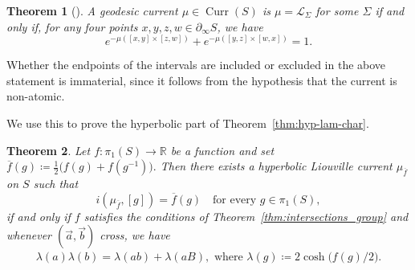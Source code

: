 \documentclass[11pt]{amsart}
\newcommand{\ora}[1]{\overrightarrow{#1}}
\numberwithin{equation}{section}
\numberwithin{figure}{section}
\newtheorem{theorem}{Theorem}[section]
\theoremstyle{definition}
\theoremstyle{plain}
\DeclareMathOperator{\Curr}{Curr}
\begin{document}
\begin{theorem}[{\cite[Theorem~13]{Bonahon88:GeodesicCurrent}}]   \label{thm:bonahonliouville}
   A geodesic current $\mu \in \Curr(S)$ is $\mu=\mathcal{L}_{\Sigma}$ for some $\Sigma$ if and only if, for any four points $x,y,z,w \in \partial_{\infty} S$, we have
   \[
      e^{-\mu([x,y]\times[z,w])} + e^{-\mu([y,z]\times [w,x])}=1.
   \]
\end{theorem}
Whether the endpoints of the intervals are included or excluded in the
above statement is immaterial, since it follows from the hypothesis that the current is non-atomic. 

We use this to prove the hyperbolic part of Theorem~\ref{thm:hyp-lam-char}.

\begin{theorem}
Let $f \colon \pi_1(S) \to \mathbb{R}$ be a function and set $\overline{f}(g) \coloneqq \frac{1}{2}\bigl(f(g)+f(g^{-1})\bigr).$
Then there exists a hyperbolic Liouville current
$\mu_{\overline f}$ on $S$ such that
\[
i(\mu_{\overline f},[g])=\overline f(g)
\quad\text{for every } g\in \pi_1(S),
\]
if and only if $f$ satisfies the conditions of
Theorem~\ref{thm:intersections_group}
and whenever $(\ora{a},\ora{b})$ cross, we have
 \begin{align}
    \label{eq:lambdasmoothing}  \lambda(a)\lambda(b)
= \lambda(ab)+\lambda(aB), \text{ where }
\lambda(g)
\coloneqq 2\cosh\!\bigl(f(g)/2\bigr).
  \end{align}
\end{theorem}
\end{document}
